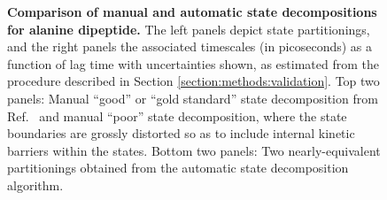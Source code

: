 \begin{figure}[tb]
  \begin{center}
  \end{center}
  \caption{{\bf Comparison of manual and automatic state decompositions for alanine dipeptide.}  
  The left panels depict state partitionings, and the right panels the associated timescales (in picoseconds) as a function of lag time with uncertainties shown, as estimated from the procedure described in Section \ref{section:methods:validation}.
  Top two panels: Manual ``good'' or ``gold standard'' state decomposition from Ref.\ \cite{chodera:mms:2006} and manual ``poor'' state decomposition, where the state boundaries are grossly distorted so as to include internal kinetic barriers within the states.
  Bottom two panels: Two nearly-equivalent partitionings obtained from the automatic state decomposition algorithm.
  }
  \label{figure:alanine-dipeptide-manual-vs-automatic}
\end{figure}

